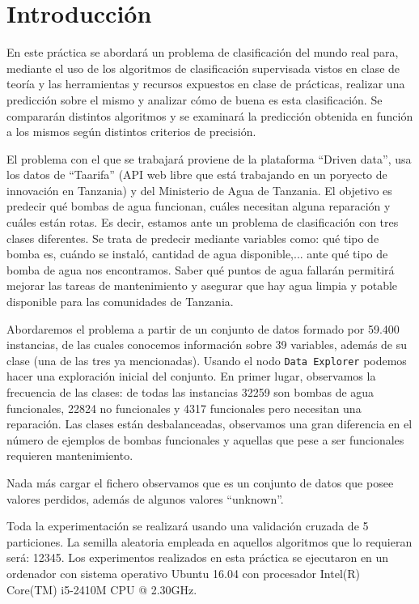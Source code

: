 \documentclass[a4paper, 17pt]{article}
\begin{document}
\section{Introducción}

En este práctica se abordará un problema de clasificación del mundo real para, mediante el uso de los algoritmos de clasificación supervisada vistos en clase de teoría y las herramientas y recursos expuestos en clase de prácticas, realizar una predicción sobre el mismo y analizar cómo de buena es esta clasificación. Se compararán distintos algoritmos y se examinará la predicción obtenida en función a los mismos según distintos criterios de precisión.

El problema con el que se trabajará proviene de la plataforma ``Driven data'', usa los datos de ``Taarifa'' (API web libre que está trabajando en un poryecto de innovación en Tanzania) y del Ministerio de Agua de Tanzania. El objetivo es predecir qué bombas de agua funcionan, cuáles necesitan alguna reparación y cuáles están rotas. Es decir, estamos ante un problema de clasificación con tres clases diferentes. Se trata de predecir mediante variables como: qué tipo de bomba es, cuándo se instaló, cantidad de agua disponible,... ante qué tipo de bomba de agua nos encontramos. Saber qué puntos de agua fallarán permitirá mejorar las tareas de mantenimiento y asegurar que hay agua limpia y potable disponible para las comunidades de Tanzania.

Abordaremos el problema a partir de un conjunto de datos formado por 59.400 instancias, de las cuales conocemos información sobre 39 variables, además de su clase (una de las tres ya mencionadas).
Usando el nodo \texttt{Data Explorer} podemos hacer una exploración inicial del conjunto. En primer lugar, observamos la frecuencia de las clases: de todas las instancias 32259 son bombas de agua funcionales, 22824 no funcionales y 4317 funcionales pero necesitan una reparación. Las clases están desbalanceadas, observamos una gran diferencia en el número de ejemplos de bombas funcionales y aquellas que pese a ser funcionales requieren mantenimiento.

Nada más cargar el fichero observamos que es un conjunto de datos que posee valores perdidos, además de algunos valores ``unknown''. 

Toda la experimentación se realizará usando una validación cruzada de 5 particiones. La semilla aleatoria empleada en aquellos algoritmos que lo requieran será: 12345.
Los experimentos realizados en esta práctica se ejecutaron en un ordenador con sistema operativo Ubuntu 16.04 con procesador Intel(R) Core(TM) i5-2410M CPU @ 2.30GHz.
\end{document}
